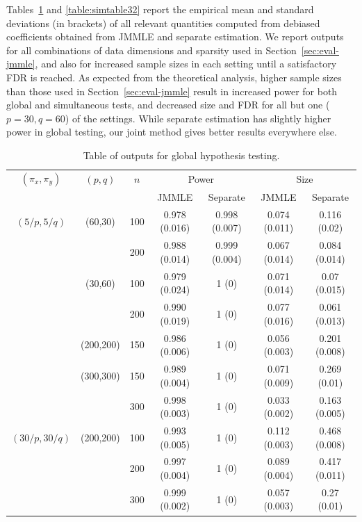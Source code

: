 Tables~\ref{table:simtable31} and \ref{table:simtable32} report the empirical mean and standard deviations (in brackets) of all relevant quantities computed from debiased coefficients obtained from JMMLE and separate estimation. We report outputs for all combinations of data dimensions and sparsity used in Section~\ref{sec:eval-jmmle}, and also for increased sample sizes in each setting until a satisfactory FDR is reached. As expected from the theoretical analysis, higher sample sizes than those used in Section~\ref{sec:eval-jmmle} result in increased power for both global and simultaneous tests, and decreased size and FDR for all but one ($p=30, q=60$) of the settings. While separate estimation has slightly higher power in global testing, our joint method gives better results everywhere else.

%
\begin{scriptsize}
\begin{table}
    \begin{tabular}{ccccccc}
    \hline
$(\pi_x, \pi_y)$ & $(p,q)$   & $n$ & \multicolumn{2}{c}{Power} & \multicolumn{2}{c}{Size}\\\cline{4-7}
 & & & JMMLE     & Separate			   & JMMLE         & Separate           \\ \hline
    $(5/p, 5/q)$ & (60,30)   & 100 & 0.978 (0.016) & 0.998 (0.007) & 0.074 (0.011) & 0.116 (0.02) \\
    ~            & ~         & 200 & 0.988 (0.014) & 0.999 (0.004) & 0.067 (0.014) & 0.084 (0.014) \\
    ~            & (30,60)   & 100 & 0.979 (0.024) & 1 (0)         & 0.071 (0.014) & 0.07  (0.015)  \\
    ~            & ~         & 200 & 0.990 (0.019) & 1 (0)         & 0.077 (0.016) & 0.061 (0.013) \\
    ~            & (200,200) & 150 & 0.986 (0.006) & 1 (0)         & 0.056 (0.003) & 0.201 (0.008) \\
    ~            & (300,300) & 150 & 0.989 (0.004) & 1 (0)         & 0.071 (0.009) & 0.269 (0.01) \\
    ~            & ~         & 300 & 0.998 (0.003) & 1 (0)         & 0.033 (0.002) & 0.163 (0.005) \\ \hline
  $(30/p, 30/q)$ & (200,200) & 100 & 0.993 (0.005) & 1 (0)         & 0.112 (0.003) & 0.468 (0.008) \\
    ~            & ~         & 200 & 0.997 (0.004) & 1 (0)         & 0.089 (0.004) & 0.417 (0.011) \\
    ~            & ~         & 300 & 0.999 (0.002) & 1 (0)         & 0.057 (0.003) & 0.27 (0.01) \\ \hline
    \end{tabular}
    \caption{Table of outputs for global hypothesis testing.}
    \label{table:simtable31}
\end{table}
\end{scriptsize}

